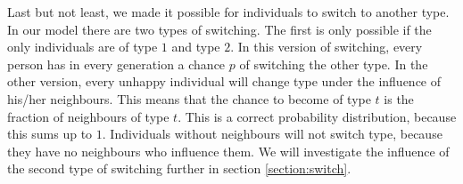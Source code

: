 Last but not least, we made it possible for individuals to switch to another type.
In our model there are two types of switching.
The first is only possible if the only individuals are of type $1$ and type $2$.
In this version of switching, every person has in every generation a chance $p$ of switching the other type.
In the other version, every unhappy individual will change type under the influence of his/her neighbours.
This means that the chance to become of type $t$ is the fraction of neighbours of type $t$.
This is a correct probability distribution, because this sums up to $1$.
Individuals without neighbours will not switch type, because they have no neighbours who influence them.
We will investigate the influence of the second type of switching further in section \ref{section:switch}.


